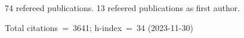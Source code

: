 74 refereed publications. 13 refeered publications as first author.

Total citations~=~3641; h-index~=~34 (2023-11-30)